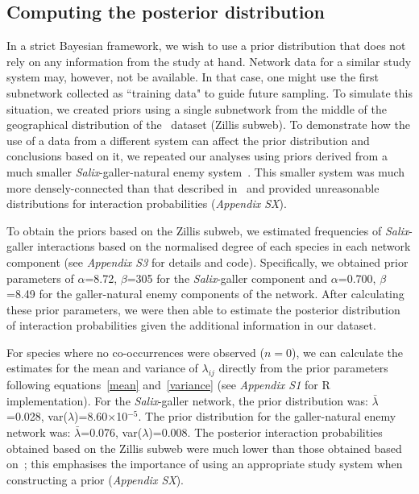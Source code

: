 \documentclass[12pt]{article}
\begin{document}
\begin{spacing}{2.0}

  \subsection*{Computing the posterior distribution}

      In a strict Bayesian framework, we wish to use a prior distribution that does not rely on any information from the study at hand. Network data for a similar study system may, however, not be available. In that case, one might use the first subnetwork collected as ``training data" to guide future sampling. To simulate this situation, we created priors using a single subnetwork from the middle of the geographical distribution of the~\citep{Kopelke2017} dataset (Zillis subweb). To demonstrate how the use of a data from a different system can affect the prior distribution and conclusions based on it, we repeated our analyses using priors derived from a much smaller \emph{Salix}-galler-natural enemy system~\citep{Barbour2016,Barbour2016Dryad}. This smaller system was much more densely-connected than that described in~\citet{Kopelke2017} and provided unreasonable distributions for interaction probabilities (\emph{Appendix SX}). 


      To obtain the priors based on the Zillis subweb, we estimated frequencies of \emph{Salix}-galler interactions based on the normalised degree of each species in each network component (see \emph{Appendix S3} for details and code). Specifically, we obtained prior parameters of $\alpha$=8.72, $\beta$=305 for the \emph{Salix}-galler component and $\alpha$=0.700, $\beta$=8.49 for the galler-natural enemy components of the network. After calculating these prior parameters, we were then able to estimate the posterior distribution of interaction probabilities given the additional information in our dataset.
  

      For species where no co-occurrences were observed ($n=0$), we can calculate the estimates for the mean and variance of $\lambda_{ij}$ directly from the prior parameters following equations~\ref{mean} and~\ref{variance} (see \emph{Appendix S1} for R implementation). For the \emph{Salix}-galler network, the prior distribution  was: $\bar\lambda$=0.028, var($\lambda$)=8.60$\times$10$^{-5}$. The prior distribution for the galler-natural enemy network was: $\bar\lambda$=0.076, var($\lambda$)=0.008. The posterior interaction probabilities obtained based on the Zillis subweb were much lower than those obtained based on~\citet{Barbour2016}; this emphasises the importance of using an appropriate study system when constructing a prior (\emph{Appendix SX}).



\end{spacing}
\end{document}
